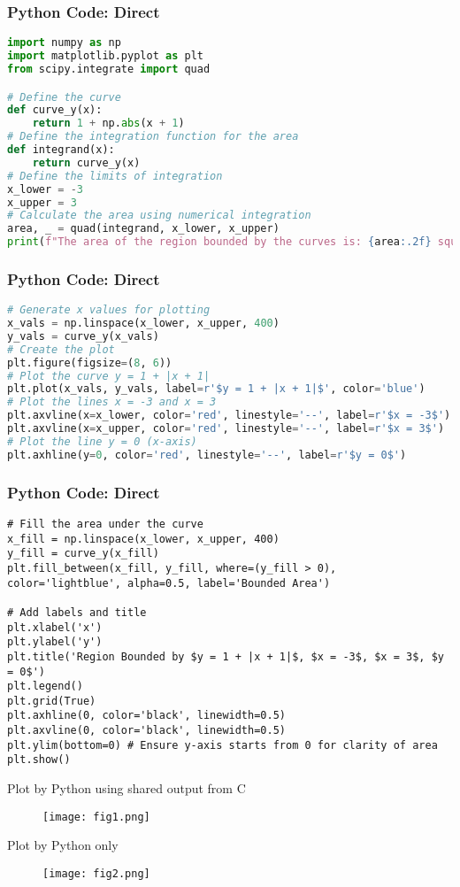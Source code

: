 \documentclass{beamer}
\begin{document}
\begin{frame}[fragile]
\frametitle{Python Code: Direct}
\begin{lstlisting}[language=Python]
import numpy as np
import matplotlib.pyplot as plt
from scipy.integrate import quad

# Define the curve
def curve_y(x):
    return 1 + np.abs(x + 1)
# Define the integration function for the area
def integrand(x):
    return curve_y(x)
# Define the limits of integration
x_lower = -3
x_upper = 3
# Calculate the area using numerical integration
area, _ = quad(integrand, x_lower, x_upper)
print(f"The area of the region bounded by the curves is: {area:.2f} square units")
\end{lstlisting}
\end{frame}

\begin{frame}[fragile]
\frametitle{Python Code: Direct}
\begin{lstlisting}[language=Python]
# Generate x values for plotting
x_vals = np.linspace(x_lower, x_upper, 400)
y_vals = curve_y(x_vals)
# Create the plot
plt.figure(figsize=(8, 6))
# Plot the curve y = 1 + |x + 1|
plt.plot(x_vals, y_vals, label=r'$y = 1 + |x + 1|$', color='blue')
# Plot the lines x = -3 and x = 3
plt.axvline(x=x_lower, color='red', linestyle='--', label=r'$x = -3$')
plt.axvline(x=x_upper, color='red', linestyle='--', label=r'$x = 3$')
# Plot the line y = 0 (x-axis)
plt.axhline(y=0, color='red', linestyle='--', label=r'$y = 0$')
\end{lstlisting}
\end{frame}

\begin{frame}[fragile]
\frametitle{Python Code: Direct}
\begin{lstlisting}
# Fill the area under the curve
x_fill = np.linspace(x_lower, x_upper, 400)
y_fill = curve_y(x_fill)
plt.fill_between(x_fill, y_fill, where=(y_fill > 0), color='lightblue', alpha=0.5, label='Bounded Area')

# Add labels and title
plt.xlabel('x')
plt.ylabel('y')
plt.title('Region Bounded by $y = 1 + |x + 1|$, $x = -3$, $x = 3$, $y = 0$')
plt.legend()
plt.grid(True)
plt.axhline(0, color='black', linewidth=0.5)
plt.axvline(0, color='black', linewidth=0.5)
plt.ylim(bottom=0) # Ensure y-axis starts from 0 for clarity of area
plt.show()
\end{lstlisting}
\end{frame}

\begin{frame}{Plot by Python using shared output from C}
\begin{figure}[H]
\centering
\texttt{[image: fig1.png]}
\caption{}
\label{fig:1}
\end{figure}
\end{frame}

\begin{frame}{Plot by Python only}
\begin{figure}[H]
\centering
\texttt{[image: fig2.png]}
\caption{}
\label{fig:2}
\end{figure}
\end{frame}
\end{document}
